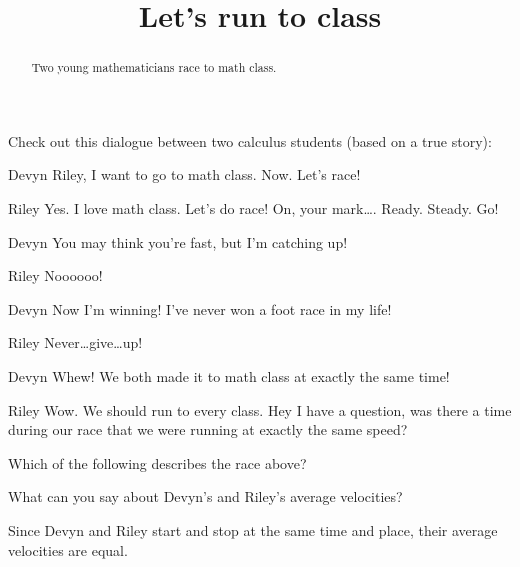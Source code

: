 \documentclass{ximera}
\title[Break-Ground:]{Let's run to class}
\begin{document}
\begin{abstract}
Two young mathematicians race to math class.
\end{abstract}
\maketitle

Check out this dialogue between two calculus students (based on a true
story):


\begin{dialogue}
\item[Devyn] Riley, I want to go to math class. Now. Let's race!
\item[Riley] Yes. I love math class. Let's do race! On, your
  mark\dots. Ready. Steady. Go!
\item[Devyn] You may think you're fast, but I'm catching up!
\item[Riley] Noooooo!
\item[Devyn] Now I'm winning! I've never won a foot race in my life!
\item[Riley] Never\dots give\dots up!
\item[Devyn] Whew! We both made it to math class at exactly the same
  time!
\item[Riley] Wow. We should run to every class. Hey I have a question,
  was there a time during our race that we were running at exactly the
  same speed?
\end{dialogue}

\begin{problem}
  Which of the following describes the race above?
  \begin{multipleChoice}
  \end{multipleChoice}
\end{problem}

\begin{problem}
  What can you say about Devyn's and Riley's average velocities?
  \begin{multipleChoice}
  \begin{feedback}
    Since Devyn and Riley start and stop at the same time and place,
    their average velocities are equal.
  \end{feedback}
  \end{multipleChoice}
\end{problem}


\end{document}
